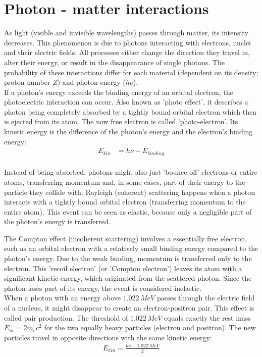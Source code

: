 \section{Photon - matter interactions}
\label{sec:photon}

As light (visible and invisible wavelengths) passes through matter, its intensity decreases.
This phenomenon is due to photons interacting with electrons, nuclei and their electric fields.
All processes either change the direction they travel in, alter their energy, or result in the disappearance of single photons.
The probability of these interactions differ for each material (dependent on its density; proton number $Z$) and photon energy ($h\nu$). \\

If a photon's energy exceeds the binding energy of an orbital electron, the photoelectric interaction can occur.
Also known as 'photo effect', it describes a photon being completely absorbed by a tightly bound orbital electron which then is ejected from its atom.
The now free electron is called 'photo-electron'. Its kinetic energy is the difference of the photon's energy and the electron's binding energy:
\begin{align}
E_{kin} &= h\nu - E_{binding}
\end{align} \\

Instead of being absorbed, photons might also just 'bounce off' electrons or entire atoms, transferring momentum and, in some cases, part of their energy to the particle they collide with.
Rayleigh (coherent) scattering happens when a photon interacts with a tightly bound orbital electron (transferring momentum to the entire atom).
This event can be seen as elastic, because only a negligible part of the photon's energy is transferred.

The Compton effect (incoherent scattering) involves a essentially free electron, such as an orbital electron with a relatively small binding energy compared to the photon's energy.
Due to the weak binding, momentum is transferred only to the electron.
This 'recoil electron' (or 'Compton electron') leaves its atom with a significant kinetic energy, which originated from the scattered photon.
Since the photon loses part of its energy, the event is considered inelastic. \\

When a photon with an energy above $1.022 \, MeV$ passes through the electric field of a nucleus, it might disappear to create an electron-positron pair.
This effect is called pair production.
The threshold of $1.022 \, MeV$ equals exactly the rest mass $E_m = 2m_ec^2$ for the two equally heavy particles (electron and positron).
The new particles travel in opposite directions with the same kinetic energy:
\begin{align}
 E_{kin} = \frac{h\nu - 1.022 \, MeV}{2}
\end{align} \\

